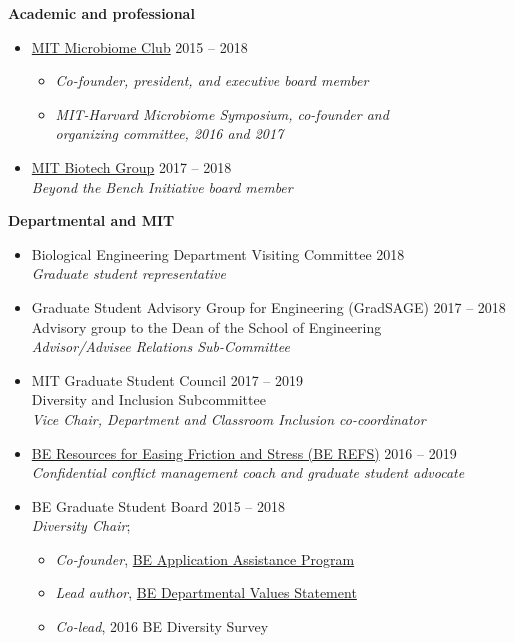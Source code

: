 \documentclass[10pt]{article}
\newenvironment{outerlist}[1][\enskip\textbullet]%
        {\begin{itemize}[#1,leftmargin=*]}{\end{itemize}%
         \vspace{-.6\baselineskip}}
\newenvironment{innerlist}[1][\enskip\textbullet]%
        {\begin{itemize}[#1,leftmargin=*,parsep=0pt,itemsep=0pt,topsep=0pt,partopsep=0pt]}
        {\end{itemize}}
\begin{document}
\textbf{Academic and professional}
\begin{outerlist}
	\item[] \href{https://twitter.com/MITubiomeclub}{MIT Microbiome Club} \hfill {2015 -- 2018} 
		\begin{innerlist}
			\item[] \textit{Co-founder, president, and executive board member} 
			\item[] \textit{MIT-Harvard Microbiome Symposium, co-founder and \\ organizing committee, 2016 and 2017}
		\end{innerlist}
	\item[] \href{http://biotech.mit.edu/}{MIT Biotech Group} \hfill {2017 -- 2018} \\ 
		\textit{Beyond the Bench Initiative board member} 
\end{outerlist}
\vspace{.15in}

\textbf{Departmental and MIT}
\begin{outerlist}
	\item[] Biological Engineering Department Visiting Committee \hfill {2018} \\
	\textit{Graduate student representative}
	\item[] Graduate Student Advisory Group for Engineering (GradSAGE) \hfill {2017 -- 2018} \\
	Advisory group to the Dean of the School of Engineering \\
	\textit{Advisor/Advisee Relations Sub-Committee}
	\item[] MIT Graduate Student Council \hfill {2017 -- 2019} \\
		Diversity and Inclusion Subcommittee  \\
		\textit{Vice Chair, Department and Classroom Inclusion co-coordinator} 
	\item[] \href{http://berefs.com/}{BE Resources for Easing Friction and Stress (BE REFS)} \hfill {2016 -- 2019} \\
	\textit{Confidential conflict management coach and graduate student advocate}
	\item[] BE Graduate Student Board \hfill {2015 -- 2018} \\ 
		\textit{Diversity Chair}; 
		\begin{innerlist}
			\item[] \textit{Co-founder}, \href{http://be.mit.edu/academic-programs/prospective-graduate/beaap}{BE Application Assistance Program} 
			\item[] \textit{Lead author}, \href{http://be.mit.edu/about/department-values-statement}{BE Departmental Values Statement}
			\item[] \textit{Co-lead}, 2016 BE Diversity Survey
		\end{innerlist}
\end{outerlist}
\vspace{.15in}
\end{document}

